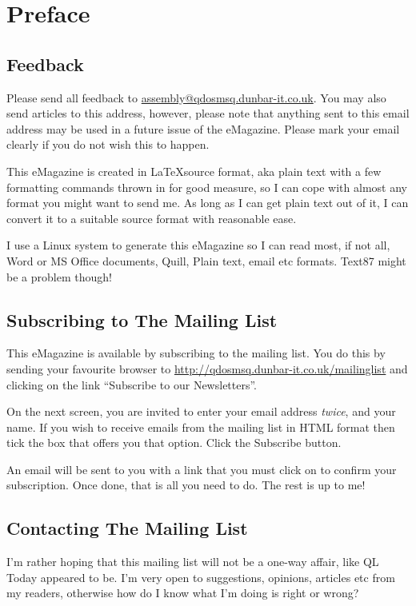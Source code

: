 \chapter{Preface}
\section{Feedback}
Please send all feedback to \url{assembly@qdosmsq.dunbar-it.co.uk}. You may also send articles to
this address, however, please note that anything sent to this email address may be used in a future issue of the eMagazine. Please mark your email clearly if you do not wish this to happen.

This eMagazine is created in \LaTeX  source format, aka plain text with a few formatting commands thrown in for good measure, so I can cope with almost any format you might want to send me. As long as I can get plain text out of it, I can convert it to a suitable source format with reasonable ease. 

I use a Linux system to generate this eMagazine so I can read most, if not all, Word or MS Office documents, Quill, Plain text, email etc formats. Text87 might be a problem though!

\section{Subscribing to The Mailing List}
This eMagazine is available by subscribing to the mailing list. You do this by sending your favourite browser to \url{http://qdosmsq.dunbar-it.co.uk/mailinglist} and clicking on the link ``Subscribe to our Newsletters''.

On the next screen, you are invited to enter your email address \emph{twice}, and your name. If you wish to receive emails from the mailing list in HTML format then tick the box that offers you that option. Click the Subscribe button.

An email will be sent to you with a link that you must click on to confirm your subscription. Once done, that is all you need to do. The rest is up to me!

\section{Contacting The Mailing List}
I'm rather hoping that this mailing list will not be a one-way affair, like QL Today appeared to be. I'm very open to suggestions, opinions, articles etc from my readers, otherwise how do I know what I'm doing is right or wrong?

